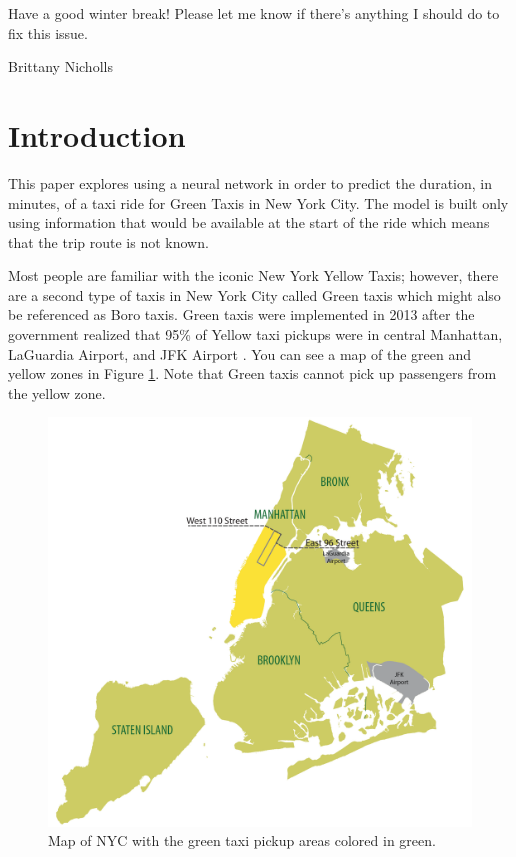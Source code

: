 \documentclass[conference]{IEEEtran}
\begin{document}
Have a good winter break!  Please let me know if there's anything I should do to fix this issue.

Brittany Nicholls

\section{Introduction}

This paper explores using a neural network in order to predict the duration, in minutes, of a taxi ride for Green Taxis in New York City.  The model is built only using information that would be available at the start of the ride which means that the trip route is not known.

Most people are familiar with the iconic New York Yellow Taxis;  however, there are a second type of taxis in New York City called Green taxis which might also be referenced as Boro taxis.  Green taxis were implemented in 2013 after the government realized that 95\% of Yellow taxi pickups were in central Manhattan, LaGuardia Airport, and JFK Airport \cite{boroBackground}.  You can see a map of the green and yellow zones in Figure \ref{greenZone}.   Note that Green taxis cannot pick up passengers from the yellow zone.

\begin{figure}
  \centering
    \includegraphics[width=\linewidth]{map_service_area.png}
      \caption{Map of NYC with the green taxi pickup areas colored in green. \cite{boroTaxi}}
      \label{greenZone}
\end{figure}
\end{document}
